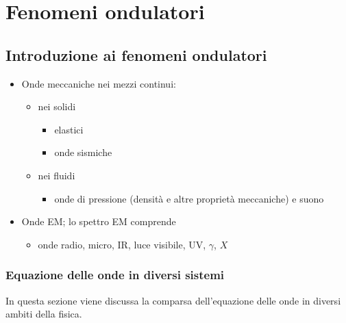 \documentclass[letterpaper,10pt,italian]{jupyterBook}
\begin{document}
\sphinxstepscope


\part{Fenomeni ondulatori}

\sphinxstepscope


\chapter{Introduzione ai fenomeni ondulatori}
\label{\detokenize{ch/waves/intro:introduzione-ai-fenomeni-ondulatori}}\label{\detokenize{ch/waves/intro:physics-hs-waves-intro}}\label{\detokenize{ch/waves/intro::doc}}\begin{itemize}
\item {} 
\sphinxAtStartPar
Onde meccaniche nei mezzi continui:
\begin{itemize}
\item {} 
\sphinxAtStartPar
nei solidi
\begin{itemize}
\item {} 
\sphinxAtStartPar
elastici

\item {} 
\sphinxAtStartPar
onde sismiche

\end{itemize}

\item {} 
\sphinxAtStartPar
nei fluidi
\begin{itemize}
\item {} 
\sphinxAtStartPar
onde di pressione (densità e altre proprietà meccaniche) e suono

\end{itemize}

\end{itemize}

\item {} 
\sphinxAtStartPar
Onde EM; lo spettro EM comprende
\begin{itemize}
\item {} 
\sphinxAtStartPar
onde radio, micro, IR, luce visibile, UV, \(\gamma\), \(X\)

\end{itemize}

\end{itemize}


\section{Equazione delle onde in diversi sistemi}
\label{\detokenize{ch/waves/intro:equazione-delle-onde-in-diversi-sistemi}}\label{\detokenize{ch/waves/intro:physics-hs-waves-equation-examples}}
\sphinxAtStartPar
In questa sezione viene discussa la comparsa dell’equazione delle onde in diversi ambiti della fisica.
\end{document}
